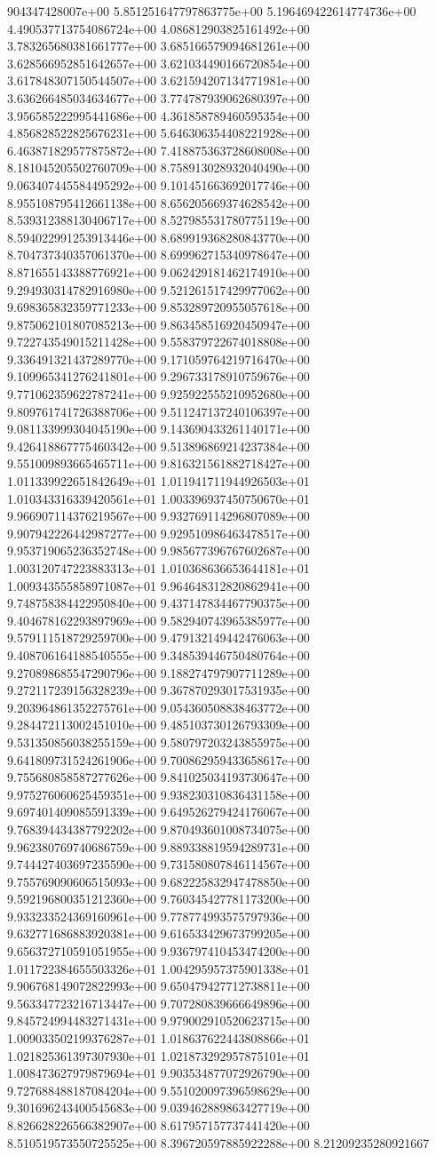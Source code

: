 904347428007e+00	5.851251647797863775e+00	5.196469422614774736e+00	4.490537713754086724e+00	4.086812903825161492e+00	3.783265680381661777e+00	3.685166579094681261e+00	3.628566952851642657e+00	3.621034490166720854e+00	3.617848307150544507e+00	3.621594207134771981e+00	3.636266485034634677e+00	3.774787939062680397e+00	3.956585222995441686e+00	4.361858789460595354e+00	4.856828522825676231e+00	5.646306354408221928e+00	6.463871829577875872e+00	7.418875363728608008e+00	8.181045205502760709e+00	8.758913028932040490e+00	9.063407445584495292e+00	9.101451663692017746e+00	8.955108795412661138e+00	8.656205669374628542e+00	8.539312388130406717e+00	8.527985531780775119e+00	8.594022991253913446e+00	8.689919368280843770e+00	8.704737340357061370e+00	8.699962715340978647e+00	8.871655143388776921e+00	9.062429181462174910e+00	9.294930314782916980e+00	9.521261517429977062e+00	9.698365832359771233e+00	9.853289720955057618e+00	9.875062101807085213e+00	9.863458516920450947e+00	9.722743549015211428e+00	9.558379722674018808e+00	9.336491321437289770e+00	9.171059764219716470e+00	9.109965341276241801e+00	9.296733178910759676e+00	9.771062359622787241e+00	9.925922555210952680e+00	9.809761741726388706e+00	9.511247137240106397e+00	9.081133999304045190e+00	9.143690433261140171e+00	9.426418867775460342e+00	9.513896869214237384e+00	9.551009893665465711e+00	9.816321561882718427e+00	1.011339922651842649e+01	1.011941711944926503e+01	1.010343316339420561e+01	1.003396937450750670e+01	9.966907114376219567e+00	9.932769114296807089e+00	9.907942226442987277e+00	9.929510986463478517e+00	9.953719065236352748e+00	9.985677396767602687e+00	1.003120747223883313e+01	1.010368636653644181e+01	1.009343555858971087e+01	9.964648312820862941e+00	9.748758384422950840e+00	9.437147834467790375e+00	9.404678162293897969e+00	9.582940743965385977e+00	9.579111518729259700e+00	9.479132149442476063e+00	9.408706164188540555e+00	9.348539446750480764e+00	9.270898685547290796e+00	9.188274797907711289e+00	9.272117239156328239e+00	9.367870293017531935e+00	9.203964861352275761e+00	9.054360508838463772e+00	9.284472113002451010e+00	9.485103730126793309e+00	9.531350856038255159e+00	9.580797203243855975e+00	9.641809731524261906e+00	9.700862959433658617e+00	9.755680858587277626e+00	9.841025034193730647e+00	9.975276060625459351e+00	9.938230310836431158e+00	9.697401409085591339e+00	9.649526279424176067e+00	9.768394434387792202e+00	9.870493601008734075e+00	9.962380769740686759e+00	9.889338819594289731e+00	9.744427403697235590e+00	9.731580807846114567e+00	9.755769090606515093e+00	9.682225832947478850e+00	9.592196800351212360e+00	9.760345427781173200e+00	9.933233524369160961e+00	9.778774993575797936e+00	9.632771686883920381e+00	9.616533429673799205e+00	9.656372710591051955e+00	9.936797410453474200e+00	1.011722384655503326e+01	1.004295957375901338e+01	9.906768149072822993e+00	9.650479427712738811e+00	9.563347723216713447e+00	9.707280839666649896e+00	9.845724994483271431e+00	9.979002910520623715e+00	1.009033502199376287e+01	1.018637622443808866e+01	1.021825361397307930e+01	1.021873292957875101e+01	1.008473627979879694e+01	9.903534877072926790e+00	9.727688488187084204e+00	9.551020097396598629e+00	9.301696243400545683e+00	9.039462889863427719e+00	8.826628226566382907e+00	8.617957157737441420e+00	8.510519573550725525e+00	8.396720597885922288e+00	8.21209235280921667